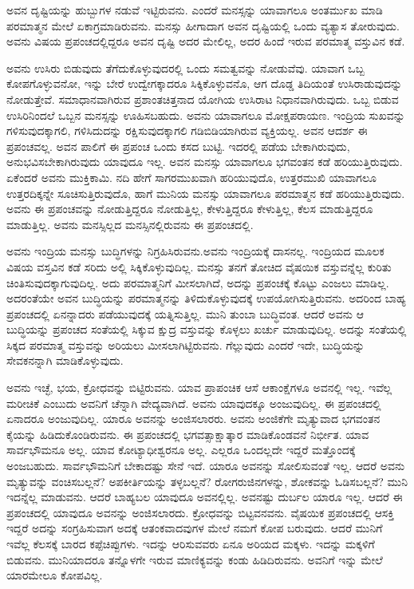 ಅವನ ದೃಷ್ಟಿಯನ್ನು ಹುಬ್ಬುಗಳ ನಡುವೆ ಇಟ್ಟಿರುವನು. ಎಂದರೆ ಮನಸ್ಸನ್ನು ಯಾವಾಗಲೂ ಅಂತರ್ಮುಖ ಮಾಡಿ ಪರಮಾತ್ಮನ ಮೇಲೆ ಏಕಾಗ್ರಮಾಡಿರುವನು. ಮನಸ್ಸು ಹೀಗಾದಾಗ ಅವನ ದೃಷ್ಟಿಯಲ್ಲಿ ಒಂದು ವ್ಯತ್ಯಾಸ ತೋರುವುದು. ಅವನು ವಿಷಯ ಪ್ರಪಂಚದಲ್ಲಿದ್ದರೂ ಅವನ ದೃಷ್ಟಿ ಅದರ ಮೇಲಿಲ್ಲ, ಅದರ ಹಿಂದೆ ಇರುವ ಪರಮಾತ್ಮ ವಸ್ತುವಿನ ಕಡೆ.

ಅವನು ಉಸಿರು ಬಿಡುವುದು ತೆಗೆದುಕೊಳ್ಳುವುದರಲ್ಲಿ ಒಂದು ಸಮತ್ವವನ್ನು ನೋಡುವೆವು. ಯಾವಾಗ ಒಬ್ಬ ಕೋಪಗೊಳ್ಳುವನೋ, ಇನ್ನು ಬೇರೆ ಉದ್ವೇಗಕ್ಕಾದರೂ ಸಿಕ್ಕಿಕೊಳ್ಳುವನೊ, ಆಗ ದೊಡ್ಡ ತಿದಿಯಂತೆ ಉಸಿರಾಡುವುದನ್ನು ನೋಡುತ್ತೇವೆ. ಸಮಾಧಾನವಾಗಿರುವ ಪ್ರಶಾಂತಚಿತ್ತನಾದ ಯೋಗಿಯ ಉಸಿರಾಟ ನಿಧಾನವಾಗಿರುವುದು. ಒಬ್ಬ ಬಿಡುವ ಉಸಿರಿನಿಂದಲೆ ಒಬ್ಬನ ಮನಸ್ಸನ್ನು ಊಹಿಸಬಹುದು. ಅವನು ಯಾವಾಗಲೂ ಮೋಕ್ಷಪರಾಯಣ. ಇಂದ್ರಿಯ ಸುಖವನ್ನು ಗಳಿಸುವುದಕ್ಕಾಗಲಿ, ಗಳಿಸಿದುದನ್ನು ರಕ್ಷಿಸುವುದಕ್ಕಾಗಲಿ ಗಡಿಬಿಡಿಯಾಗಿರುವ ವ್ಯಕ್ತಿಯಲ್ಲ. ಅವನ ಆದರ್ಶ ಈ ಪ್ರಪಂಚವಲ್ಲ. ಅವನ ಪಾಲಿಗೆ ಈ ಪ್ರಪಂಚ ಒಂದು ಕಸದ ಬುಟ್ಟಿ. ಇದರಲ್ಲಿ ಪಡೆಯ ಬೇಕಾಗಿರುವುದು, ಅನುಭವಿಸಬೇಕಾಗಿರುವುದು ಯಾವುದೂ ಇಲ್ಲ. ಅವನ ಮನಸ್ಸು ಯಾವಾಗಲೂ ಭಗವಂತನ ಕಡೆ ಹರಿಯುತ್ತಿರುವುದು. ಏಕೆಂದರೆ ಅವನು ಮುಕ್ತಿಕಾಮಿ. ನದಿ ಹೇಗೆ ಸಾಗರಮುಖವಾಗಿ ಹರಿಯುವುದೊ, ಉತ್ತರಮುಖಿ ಯಾವಾಗಲೂ ಉತ್ತರದಿಕ್ಕನ್ನೇ ಸೂಚಿಸುತ್ತಿರುವುದೊ, ಹಾಗೆ ಮುನಿಯ ಮನಸ್ಸು ಯಾವಾಗಲೂ ಪರಮಾತ್ಮನ ಕಡೆ ಹರಿಯುತ್ತಿರುವುದು. ಅವನು ಈ ಪ್ರಪಂಚವನ್ನು ನೋಡುತ್ತಿದ್ದರೂ ನೋಡುತ್ತಿಲ್ಲ, ಕೇಳುತ್ತಿದ್ದರೂ ಕೇಳುತ್ತಿಲ್ಲ, ಕೆಲಸ ಮಾಡುತ್ತಿದ್ದರೂ ಮಾಡುತ್ತಿಲ್ಲ. ಅವನು ಮನಸ್ಸಿಲ್ಲದ ಮನಸ್ಸಿನಲ್ಲಿರುವನು ಈ ಪ್ರಪಂಚದಲ್ಲಿ.

\newpage

ಅವನು ಇಂದ್ರಿಯ ಮನಸ್ಸು ಬುದ್ಧಿಗಳನ್ನು ನಿಗ್ರಹಿಸಿರುವನು.ಅವನು ಇಂದ್ರಿಯಕ್ಕೆ ದಾಸನಲ್ಲ. ಇಂದ್ರಿಯದ ಮೂಲಕ ವಿಷಯ ವಸ್ತವಿನ ಕಡೆ ಸರಿದು ಅಲ್ಲಿ ಸಿಕ್ಕಿಕೊಳ್ಳುವುದಿಲ್ಲ. ಮನಸ್ಸು ತನಗೆ ತೋಚಿದ ವೈಷಯಿಕ ವಸ್ತುವನ್ನೆಲ್ಲ ಕುರಿತು ಚಿಂತಿಸುವುದಕ್ಕಾಗುವುದಿಲ್ಲ. ಅದು ಪರಮಾತ್ಮನಿಗೆ ಮೀಸಲಾಗಿದೆ, ಅದನ್ನು ಪ್ರಪಂಚಕ್ಕೆ ಕೊಟ್ಟು ಎಂಜಲು ಮಾಡಿಲ್ಲ. ಅದರಂತೆಯೇ ಅವನ ಬುದ್ಧಿಯನ್ನು ಪರಮಾತ್ಮನನ್ನು ತಿಳಿದುಕೊಳ್ಳುವುದಕ್ಕೆ ಉಪಯೋಗಿಸುತ್ತಿರುವನು. ಅದರಿಂದ ಬಾಹ್ಯ ಪ್ರಪಂಚದಲ್ಲಿ ಏನನ್ನಾದರು ಪಡೆಯುವುದಕ್ಕೆ ಯತ್ನಿಸುತ್ತಿಲ್ಲ. ಮುನಿ ತುಂಬಾ ಬುದ್ಧಿವಂತ. ಆದರೆ ಅವನು ಆ ಬುದ್ಧಿಯನ್ನು ಪ್ರಪಂಚದ ಸಂತೆಯಲ್ಲಿ ಸಿಕ್ಕುವ ಕ್ಷುದ್ರ ವಸ್ತುವನ್ನು ಕೊಳ್ಳಲು ಖರ್ಚು ಮಾಡುವುದಿಲ್ಲ. ಅದನ್ನು ಸಂತೆಯಲ್ಲಿ ಸಿಕ್ಕದ ಪರಮಾತ್ಮ ವಸ್ತುವನ್ನು ಅರಿಯಲು ಮೀಸಲಾಗಿಟ್ಟಿರುವನು. ಗೆಲ್ಲುವುದು ಎಂದರೆ ಇದೇ, ಬುದ್ಧಿಯನ್ನು ಸೇವಕನನ್ನಾಗಿ ಮಾಡಿಕೊಳ್ಳುವುದು.

ಅವನು ಇಚ್ಛೆ, ಭಯ, ಕ್ರೋಧವನ್ನು ಬಿಟ್ಟಿರುವನು. ಯಾವ ಪ್ರಾಪಂಚಿಕ ಆಸೆ ಆಕಾಂಕ್ಷೆಗಳೂ ಅವನಲ್ಲಿ ಇಲ್ಲ. ಇವೆಲ್ಲ ಮರೀಚಿಕೆ ಎಂಬುದು ಅವನಿಗೆ ಚೆನ್ನಾಗಿ ವೇದ್ಯವಾಗಿದೆ. ಅವನು ಯಾವುದಕ್ಕೂ ಅಂಜುವುದಿಲ್ಲ. ಈ ಪ್ರಪಂಚದಲ್ಲಿ ಏನಾದರೂ ಅಂಜುವುದಿಲ್ಲ. ಯಾರೂ ಅವನನ್ನು ಅಂಜಿಸಲಾರರು. ಅವನು ಅಂಜಿಕೆಗೇ ಮೃತ್ಯುವಾದ ಭಗವಂತನ ಕೈಯನ್ನು ಹಿಡಿದು\-ಕೊಂಡಿರುವನು. ಈ ಪ್ರಪಂಚದಲ್ಲಿ ಭಗವತ್ಸಾಕ್ಷಾತ್ಕಾರ ಮಾಡಿಕೊಂಡವನೆ ನಿರ್ಭೀತ. ಯಾವ ಸಾರ್ವಭೌಮನೂ ಅಲ್ಲ. ಯಾವ ಕೋಟ್ಯಾಧೀಶ್ವರನೂ ಅಲ್ಲ. ಎಲ್ಲರೂ ಒಂದಲ್ಲದೇ ಇದ್ದರೆ ಮತ್ತೊಂದಕ್ಕೆ ಅಂಜಬಹುದು. ಸಾರ್ವಭೌಮನಿಗೆ ಬೇಕಾದಷ್ಟು ಸೇನೆ ಇದೆ. ಯಾರೂ ಅವನನ್ನು ಸೋಲಿಸುವಂತೆ ಇಲ್ಲ. ಆದರೆ ಅವನು ಮೃತ್ಯುವನ್ನು ವಂಚಿಸಬಲ್ಲನೆ? ಅಪಕೀರ್ತಿಯನ್ನು ತಳ್ಳಬಲ್ಲನೆ? ರೋಗರುಜಿನಗಳನ್ನು, ಶೋಕವನ್ನು ಓಡಿಸಬಲ್ಲನೆ? ಮುನಿ ಇದನ್ನೆಲ್ಲ ಮಾಡುವನು. ಆದರೆ ಬಾಹ್ಯಬಲ ಯಾವುದೂ ಅವನಲ್ಲಿಲ್ಲ. ಅವನಷ್ಟು ದುರ್ಬಲ ಯಾರೂ ಇಲ್ಲ. ಆದರೆ ಈ ಪ್ರಪಂಚದಲ್ಲಿ ಯಾವುದೂ ಅವನನ್ನು ಅಂಜಿಸಲಾರದು. ಕ್ರೋಧವನ್ನು ಬಿಟ್ಟವನವನು. ವೈಷಯಿಕ ಪ್ರಪಂಚದಲ್ಲಿ ಆಸಕ್ತಿ ಇದ್ದರೆ ಅದನ್ನು ಸಂಗ್ರಹಿಸುವಾಗ ಅದಕ್ಕೆ ಆತಂಕವಾದವುಗಳ ಮೇಲೆ ನಮಗೆ ಕೋಪ ಬರುವುದು. ಆದರೆ ಮುನಿಗೆ ಇವೆಲ್ಲ ಕೆಲಸಕ್ಕೆ ಬಾರದ ಕಪ್ಪೆಚಿಪ್ಪುಗಳು. ಇದನ್ನು ಆರಿಸುವವರು ಏನೂ ಅರಿಯದ ಮಕ್ಕಳು. ಇದನ್ನು ಮಕ್ಕಳಿಗೆ ಬಿಡುವನು. ಮುನಿಯಾದರೂ ತನ್ನೊಳಗೇ ಇರುವ ಮಾಣಿಕ್ಯವನ್ನು ಕಂಡು ಹಿಡಿದಿರುವನು. ಅವನಿಗೆ ಇನ್ನು ಮೇಲೆ ಯಾರಮೇಲೂ ಕೋಪವಿಲ್ಲ.

